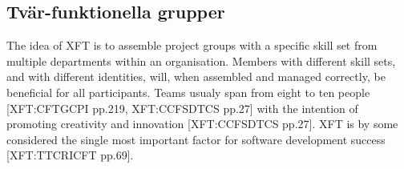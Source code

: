 \documentclass[fina_report_innit.tex]{subfiles}
\begin{document}
\subsection*{Tvär-funktionella grupper}
The idea of XFT is to assemble project groups with a specific skill set from multiple departments within an organisation. Members with different skill sets, and with different identities, will, when assembled and managed correctly, be beneficial for all participants. Teams usualy span from eight to ten people [XFT:CFTGCPI pp.219, XFT:CCFSDTCS pp.27] with the intention of promoting creativity and innovation [XFT:CCFSDTCS pp.27]. XFT is by some considered the single most important factor for software development success [XFT:TTCRICFT pp.69].
\end{document}
